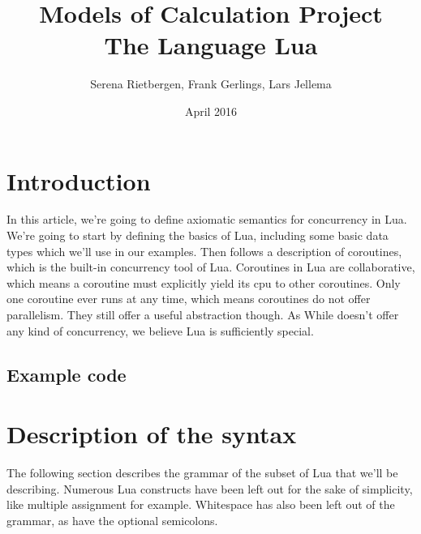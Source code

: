 \documentclass{article}
\title{Models of Calculation Project \\
         The Language Lua}
\author{Serena Rietbergen, Frank Gerlings, Lars Jellema}
\date{April 2016}
\begin{document}
\maketitle
\newpage

\tableofcontents
\newpage

\section{Introduction}

In this article, we're going to define axiomatic semantics for concurrency in
Lua. We're going to start by defining the basics of Lua, including some basic
data types which we'll use in our examples. Then follows a description of
coroutines, which is the built-in concurrency tool of Lua. Coroutines in Lua are
collaborative, which means a coroutine must explicitly yield its cpu to other
coroutines. Only one coroutine ever runs at any time, which means coroutines do
not offer parallelism. They still offer a useful abstraction though. As While
doesn't offer any kind of concurrency, we believe Lua is sufficiently special.


\subsection{Example code}




\section{Description of the syntax}

The following section describes the grammar of the subset of Lua that we'll be
describing. Numerous Lua constructs have been left out for the sake of
simplicity, like multiple assignment for example. Whitespace has also been left
out of the grammar, as have the optional semicolons.
\end{document}
